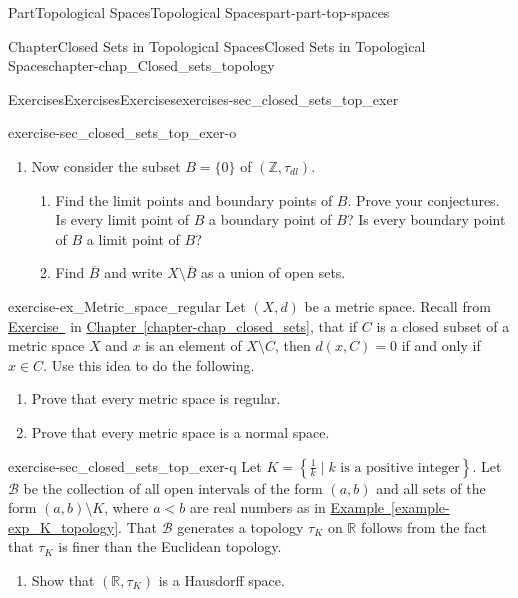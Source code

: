 \documentclass[oneside,10pt,]{book}
\newcommand{\xreffont}{\relax}
\numberwithin{equation}{chapter}
\newcommand{\Z}{\mathbb{Z}}
\newcommand{\R}{\mathbb{R}}
\newcommand{\B}{\mathcal{B}}
\newcommand{\lt}{<}
\begin{document}
\begin{partptx}{Part}{Topological Spaces}{}{Topological Spaces}{}{}{part-part-top-spaces}
\begin{chapterptx}{Chapter}{Closed Sets in Topological Spaces}{}{Closed Sets in Topological Spaces}{}{}{chapter-chap_Closed_sets_topology}
\begin{exercises-section}{Exercises}{Exercises}{}{Exercises}{}{}{exercises-sec_closed_sets_top_exer}
\begin{divisionexercise}{15}{}{}{exercise-sec_closed_sets_top_exer-o}
\begin{enumerate}[font=\bfseries,label=(\alph*),ref=\alph*]
\begin{enumerate}[font=\bfseries,label=(\roman*),ref=\theenumi.\roman*]
\item{}Find \(\overline{A}\) and write \(X \setminus \overline{A}\) as a union of open sets.%
\end{enumerate}%
\item{}Now consider the subset \(B = \{0\}\) of \((\Z, \tau_{dl})\).%
\begin{enumerate}[font=\bfseries,label=(\roman*),ref=\theenumi.\roman*]%
\item{}Find the limit points and boundary points of \(B\). Prove your conjectures. Is every limit point of \(B\) a boundary point of \(B\)? Is every boundary point of \(B\) a limit point of \(B\)?%
\item{}Find \(\overline{B}\) and write \(X \setminus \overline{B}\) as a union of open sets.%
\end{enumerate}%
\end{enumerate}%
\end{divisionexercise}%
\begin{divisionexercise}{16}{}{}{exercise-ex_Metric_space_regular}%
Let \((X,d)\) be a metric space. Recall from \hyperlink{exercise-ex_distance_pt_to_set}{Exercise~{\xreffont 8}} in \hyperref[chapter-chap_closed_sets]{Chapter~{\xreffont\ref{chapter-chap_closed_sets}}}, that if \(C\) is a closed subset of a metric space \(X\) and \(x\) is an element of \(X \setminus C\), then \(d(x,C) = 0\) if and only if \(x \in C\). Use this idea to do the following.%
\begin{enumerate}[font=\bfseries,label=(\alph*),ref=\alph*]%
\item{}Prove that every metric space is regular.%
\item{}Prove that every metric space is a normal space.%
\end{enumerate}%
\end{divisionexercise}%
\begin{divisionexercise}{17}{}{}{exercise-sec_closed_sets_top_exer-q}%
Let  \(K = \left\{\frac{1}{k} \mid k \text{ is a positive integer} \right\}\). Let \(\B\) be the collection of all open intervals of the form \((a,b)\) and all sets of the form \((a,b) \setminus K\), where \(a \lt b\) are real numbers as in \hyperref[example-exp_K_topology]{Example~{\xreffont\ref{example-exp_K_topology}}}.  That \(\B\) generates a topology \(\tau_K\) on \(\R\) follows from the fact that \(\tau_K\) is finer than the Euclidean topology.%
\begin{enumerate}[font=\bfseries,label=(\alph*),ref=\alph*]%
\item{}Show that \((\R, \tau_K)\) is a Hausdorff space.%

\end{enumerate}
\end{divisionexercise}
\end{exercises-section}
\end{chapterptx}
\end{partptx}
\end{document}
